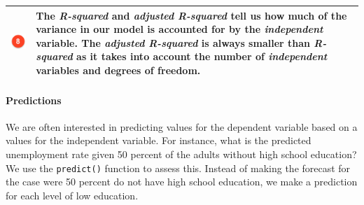 \documentclass[]{article}
\let\oldparagraph\paragraph
\renewcommand{\paragraph}[1]{\oldparagraph{#1}\mbox{}}
\begin{document}
\begin{longtable}[]{@{}ll@{}}
\begin{minipage}[t]{0.07\columnwidth}
\includegraphics[width=1\textwidth,height=\textheight]{./img/circle8.png}\strut
\end{minipage} & \begin{minipage}[t]{0.87\columnwidth}\raggedright
The \emph{R-squared} and \emph{adjusted R-squared} tell us how much of the variance in our model is accounted for by the \emph{independent} variable. The \emph{adjusted R-squared} is always smaller than \emph{R-squared} as it takes into account the number of \emph{independent} variables and degrees of freedom.\strut
\end{minipage}\tabularnewline
\bottomrule
\end{longtable}

\hypertarget{predictions}{%
\paragraph{Predictions}\label{predictions}}

We are often interested in predicting values for the dependent variable based on a values for the independent variable. For instance, what is the predicted unemployment rate given 50 percent of the adults without high school education? We use the \texttt{predict()} function to assess this. Instead of making the forecast for the case were 50 percent do not have high school education, we make a prediction for each level of low education.
\end{document}

